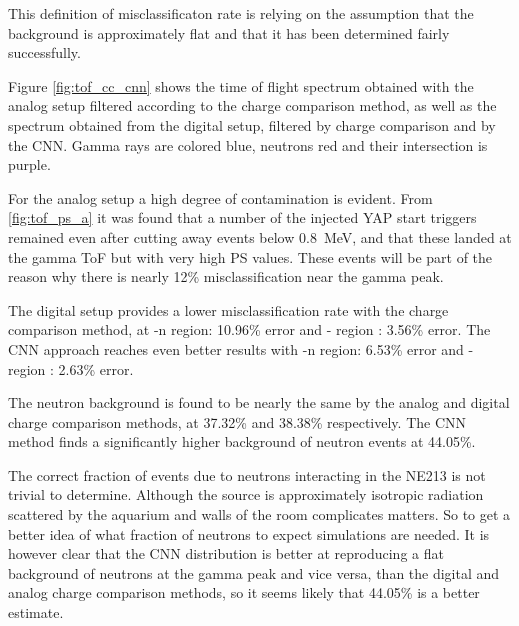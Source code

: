 \documentclass[main.tex]{subfiles}
\begin{document}
This definition of misclassificaton rate is relying on the assumption that the background is approximately flat and that it has been determined fairly successfully.

Figure \ref{fig:tof_cc_cnn} shows the time of flight spectrum obtained with the analog setup filtered according to the charge comparison method, as well as the spectrum obtained from the digital setup, filtered by charge comparison and by the CNN. Gamma rays are colored blue, neutrons red and their intersection is purple. 

For the analog setup a high degree of contamination is evident. From \ref{fig:tof_ps_a} it was found that a number of the injected YAP start triggers remained even after cutting away events below \SI{0.8}{\MeV}, and that these landed at the gamma ToF but with very high PS values. These events will be part of the reason why there is nearly 12\% misclassification near the gamma peak.

The digital setup provides a lower misclassification rate with the charge comparison method, at \textgamma-n region: 10.96\% error and \textgamma-\textgamma\; region : 3.56\% error. The CNN approach reaches even better results with \textgamma-n region: 6.53\% error and \textgamma-\textgamma\; region : 2.63\% error.

The neutron background is found to be nearly the same by the analog and digital charge comparison methods, at 37.32\% and 38.38\% respectively. The CNN method finds a significantly higher background of neutron events at 44.05\%. 

The correct fraction of events due to neutrons interacting in the NE213 is not trivial to determine. Although the source is approximately isotropic radiation scattered by the aquarium and walls of the room complicates matters. So to get a better idea of what fraction of neutrons to expect simulations are needed. It is however clear that the CNN distribution is better at reproducing a flat background of neutrons at the gamma peak and vice versa, than the digital and analog charge comparison methods, so it seems likely that 44.05\% is a better estimate.
\end{document}
